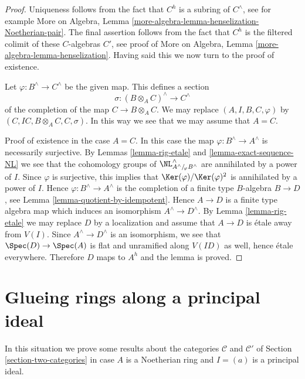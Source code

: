 \begin{proof}
Uniqueness follows from the fact that $C^h$ is a subring of
$C^\wedge$, see for example
More on Algebra, Lemma \ref{more-algebra-lemma-henselization-Noetherian-pair}.
The final assertion follows from the fact that $C^h$ is the filtered colimit
of these $C$-algebras $C'$, see proof of
More on Algebra, Lemma \ref{more-algebra-lemma-henselization}.
Having said this we now turn to the proof of existence.

\medskip\noindent
Let $\varphi : B^\wedge \to C^\wedge$ be the given map.
This defines a section
$$
\sigma : (B \otimes_A C)^\wedge \longrightarrow C^\wedge
$$
of the completion of the map $C \to B \otimes_A C$. We may
replace $(A, I, B, C, \varphi)$ by $(C, IC, B \otimes_A C, C, \sigma)$.
In this way we see that we may assume that $A = C$.

\medskip\noindent
Proof of existence in the case $A = C$. In this case the map
$\varphi : B^\wedge \to A^\wedge$ is necessarily surjective.
By Lemmas \ref{lemma-rig-etale} and \ref{lemma-exact-sequence-NL}
we see that the cohomology groups of
$\NL^\wedge_{A^\wedge/\!_\varphi B^\wedge}$
are annihilated by a power of $I$. Since $\varphi$ is surjective,
this implies that $\Ker(\varphi)/\Ker(\varphi)^2$ is annihilated
by a power of $I$. Hence $\varphi : B^\wedge \to A^\wedge$
is the completion of a finite type $B$-algebra $B \to D$, see
Lemma \ref{lemma-quotient-by-idempotent}. Hence $A \to D$ is
a finite type algebra map which induces an isomorphism
$A^\wedge \to D^\wedge$. By
Lemma \ref{lemma-rig-etale} we may replace $D$ by a localization
and assume that $A \to D$ is \'etale away from $V(I)$.
Since $A^\wedge \to D^\wedge$ is an isomorphism, we see that
$\Spec(D) \to \Spec(A)$ is flat and unramified along $V(ID)$
as well, hence \'etale everywhere. Therefore $D$ maps to
$A^h$ and the lemma is proved.
\end{proof}










\section{Glueing rings along a principal ideal}
\label{section-approximation-principal}

\noindent
In this situation we prove some results about the categories
$\mathcal{C}$ and $\mathcal{C}'$ of
Section \ref{section-two-categories}
in case $A$ is a Noetherian ring and $I = (a)$ is a principal
ideal.

